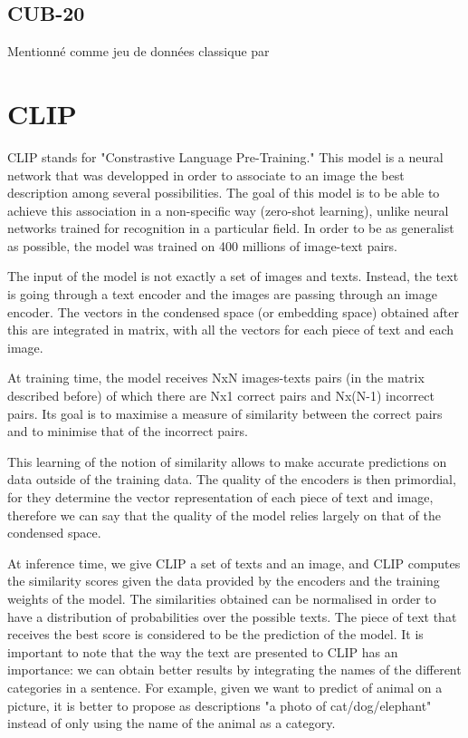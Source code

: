 \documentclass{article}
\begin{document}
\begin{appendix}
\subsection{CUB-20}

Mentionné comme jeu de données classique par \cite{zeroshot}

\section{CLIP}

CLIP stands for "Constrastive Language Pre-Training." This model is a neural network that was developped in order to associate to an image the best description among several possibilities. The goal of this model is to be able to achieve this association in a non-specific way (zero-shot learning), unlike neural networks trained for recognition in a particular field. In order to be as generalist as possible, the model was trained on 400 millions of image-text pairs. 

The input of the model is not exactly a set of images and texts. Instead, the text is going through a text encoder and the images are passing through an image encoder. The vectors in the condensed space (or embedding space) obtained after this are integrated in matrix, with all the vectors for each piece of text and each image. 

At training time, the model receives NxN images-texts pairs (in the matrix described before) of which there are Nx1 correct pairs and Nx(N-1) incorrect pairs. Its goal is to maximise a measure of similarity between the correct pairs and to minimise that of the incorrect pairs. 

This learning of the notion of similarity allows to make accurate predictions on data outside of the training data. The quality of the encoders is then primordial, for they determine the vector representation of each piece of text and image, therefore we can say that the quality of the model relies largely on that of the condensed space. 

At inference time, we give CLIP a set of texts and an image, and CLIP computes the similarity scores given the data provided by the encoders and the training weights of the model. The similarities obtained can be normalised in order to have a distribution of probabilities over the possible texts. The piece of text that receives the best score is considered to be the prediction of the model. It is important to note that the way the text are presented to CLIP has an importance: we can obtain better results by integrating the names of the different categories in a sentence. For example, given we want to predict of animal on a picture, it is better to propose as descriptions "a photo of cat/dog/elephant" instead of only using the name of the animal as a category. 


\end{appendix}
\end{document}
